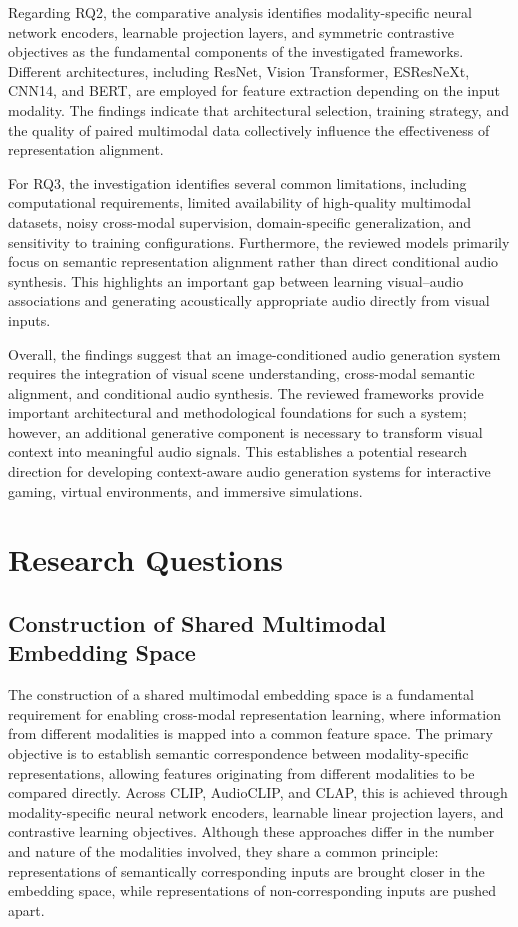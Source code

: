 \documentclass[pdflatex,sn-mathphys-num]{sn-jnl}%
\theoremstyle{thmstyleone}%
\theoremstyle{thmstyletwo}%
\theoremstyle{thmstylethree}%
\begin{document}
Regarding RQ2, the comparative analysis identifies modality-specific neural network encoders, learnable projection layers, and symmetric contrastive objectives as the fundamental components of the investigated frameworks. Different architectures, including ResNet, Vision Transformer, ESResNeXt, CNN14, and BERT, are employed for feature extraction depending on the input modality. The findings indicate that architectural selection, training strategy, and the quality of paired multimodal data collectively influence the effectiveness of representation alignment.

For RQ3, the investigation identifies several common limitations, including computational requirements, limited availability of high-quality multimodal datasets, noisy cross-modal supervision, domain-specific generalization, and sensitivity to training configurations. Furthermore, the reviewed models primarily focus on semantic representation alignment rather than direct conditional audio synthesis. This highlights an important gap between learning visual--audio associations and generating acoustically appropriate audio directly from visual inputs.

Overall, the findings suggest that an image-conditioned audio generation system requires the integration of visual scene understanding, cross-modal semantic alignment, and conditional audio synthesis. The reviewed frameworks provide important architectural and methodological foundations for such a system; however, an additional generative component is necessary to transform visual context into meaningful audio signals. This establishes a potential research direction for developing context-aware audio generation systems for interactive gaming, virtual environments, and immersive simulations.



\section{Research Questions}\label{sec3}

\subsection{Construction of Shared Multimodal Embedding Space}\label{subsec3.1}

The construction of a shared multimodal embedding space is a fundamental requirement for enabling cross-modal representation learning, where information from different modalities is mapped into a common feature space. The primary objective is to establish semantic correspondence between modality-specific representations, allowing features originating from different modalities to be compared directly. Across CLIP, AudioCLIP, and CLAP, this is achieved through modality-specific neural network encoders, learnable linear projection layers, and contrastive learning objectives. Although these approaches differ in the number and nature of the modalities involved, they share a common principle: representations of semantically corresponding inputs are brought closer in the embedding space, while representations of non-corresponding inputs are pushed apart.
\end{document}

